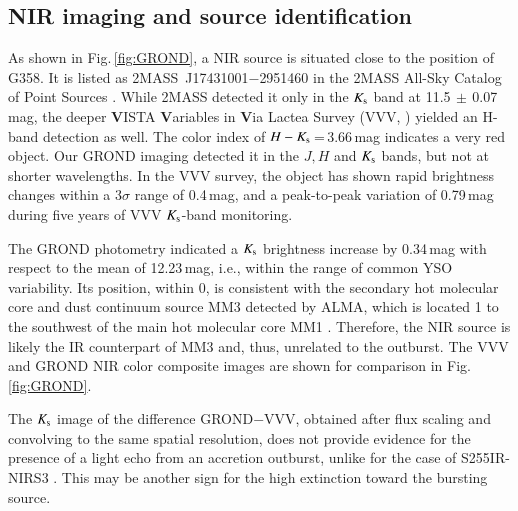 \subsection{NIR imaging and source identification}\label{rnir}
As shown in Fig.\,\ref{fig:GROND},
a NIR source is situated close to the position of G358. It is listed as 2MASS~J17431001$-$2951460 in the 2MASS All-Sky Catalog of Point Sources \citep{2003yCat.2246....0C}.
While 2MASS detected it only in the $K_{\rm s}$ band at 11.5$\,{\pm}\,$0.07\,mag, the deeper {\bf V}ISTA {\bf V}ariables in {\bf V}ia Lactea Survey (VVV, \citealp{2017yCat.2348....0M}) yielded an H-band detection as well. The color index of $H-K_{\rm s}$\,=\,3.66\,mag indicates a very red object. Our GROND imaging detected it in the $J, H$ and $K_{\rm s}$ bands, but not at shorter wavelengths. In the VVV survey, the object has shown rapid brightness changes within a 3$\sigma$ range of 0.4\,mag, and a peak-to-peak variation of 0.79\,mag during five years of VVV $K_{\rm s}$-band monitoring. 

The GROND photometry indicated a $K_{\rm s}$ brightness increase by 0.34\,mag with respect to the mean of 12.23\,mag, i.e., within the range of common YSO variability. Its position, within 0, is consistent with the secondary hot molecular core and dust continuum source MM3 detected by ALMA, which is located 1 to the southwest of the main hot molecular core MM1 \citep[cf.][]{2019ApJ...881L..39B}. Therefore, the NIR source is likely the IR counterpart of MM3 and, thus, unrelated to the outburst. The VVV and GROND NIR color composite images are shown for comparison in Fig.\,\ref{fig:GROND}.

The $K_{\rm s}$ image of the difference GROND$-$VVV, obtained after flux scaling and convolving to the same spatial resolution, does not provide evidence for the presence of a light echo from an accretion outburst, unlike for the case of S255IR-NIRS3 \citep{2017NatPh..13..276C}. This may be another sign for the high extinction toward the bursting source.

